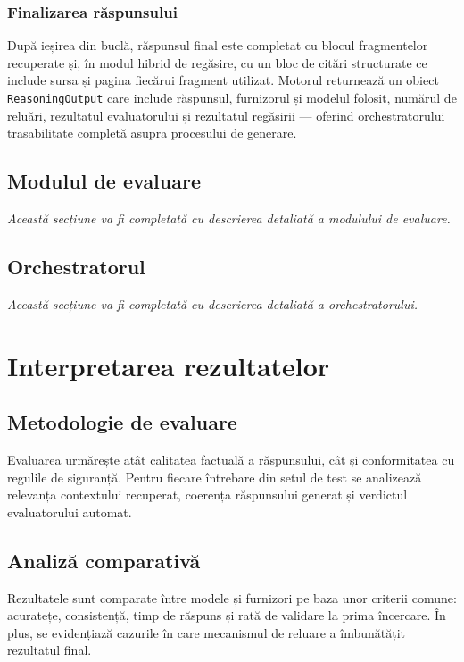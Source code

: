 \documentclass[12pt, a4paper, oneside, romanian]{teza-upb}
\begin{document}
\subsection{Finalizarea răspunsului}

După ieșirea din buclă, răspunsul final este completat cu blocul fragmentelor recuperate și, în modul hibrid de regăsire, cu un bloc de citări structurate ce include sursa și pagina fiecărui fragment utilizat. Motorul returnează un obiect \texttt{ReasoningOutput} care include răspunsul, furnizorul și modelul folosit, numărul de reluări, rezultatul evaluatorului și rezultatul regăsirii — oferind orchestratorului trasabilitate completă asupra procesului de generare.

\section{Modulul de evaluare}

\textit{Această secțiune va fi completată cu descrierea detaliată a modulului de evaluare.}

\section{Orchestratorul}

\textit{Această secțiune va fi completată cu descrierea detaliată a orchestratorului.}

\chapter{Interpretarea rezultatelor}
\section{Metodologie de evaluare}
Evaluarea urmărește atât calitatea factuală a răspunsului, cât și conformitatea cu regulile de siguranță. Pentru fiecare întrebare din setul de test se analizează relevanța contextului recuperat, coerența răspunsului generat și verdictul evaluatorului automat.

\section{Analiză comparativă}
Rezultatele sunt comparate între modele și furnizori pe baza unor criterii comune: acuratețe, consistență, timp de răspuns și rată de validare la prima încercare. În plus, se evidențiază cazurile în care mecanismul de reluare a îmbunătățit rezultatul final.
\end{document}
